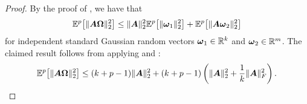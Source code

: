 \begin{proof}
    By the proof of \cite[Lemma B.1]{tropp-2023-randomized-algorithms}, we have that
    \begin{equation}
        \mathbb{E}^{p}\big[ \lVert \boldsymbol{A} \boldsymbol{\Omega} \rVert _2^2 \big]
        \leq \lVert \boldsymbol{A} \rVert _2^2 \mathbb{E}^{p}\big[ \lVert \boldsymbol{\omega}_1 \rVert _2^2 \big] + \mathbb{E}^{p}\big[ \lVert \boldsymbol{A} \boldsymbol{\omega}_2 \rVert _2^2 \big]
    \end{equation}
    for independent standard Gaussian random vectors $\boldsymbol{\omega}_1 \in \mathbb{R}^{k}$ and $\boldsymbol{\omega}_2 \in \mathbb{R}^{m}$. The claimed result follows from applying  and :
    \[
        \mathbb{E}^{p}\big[ \lVert \boldsymbol{A} \boldsymbol{\Omega} \rVert _2^2 \big]
        \leq (k + p - 1) \lVert \boldsymbol{A} \rVert _2^2  + (k + p - 1) \left( \lVert \boldsymbol{A} \rVert _2^2 + \frac{1}{k} \lVert \boldsymbol{A} \rVert _F^2 \right).
    \]
\end{proof}



